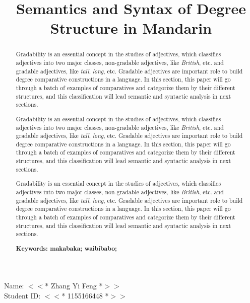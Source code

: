 \documentclass{ctexart}
\title{\LARGE{\bfseries{Semantics and Syntax of Degree Structure in Mandarin}}}
\date{\vspace{-10ex}}
\begin{document}
\begin{center}

Name: $<<$* Zhang Yi Feng *$>>$ \\
Student ID: $<<$* 1155166448 *$>>$

\end{center}

{\let\newpage\relax\maketitle}

\begin{abstract}
    \normalsize {
        Gradability is an essential concept in the studies of adjectives, which classifies adjectives into two major classes, non-gradable adjectives, like \textit{British}, etc. and gradable adjectives, like \textit{tall}, \textit{long}, etc. Gradable adjectives are important role to build degree comparative constructions in a language. In this section, this paper will go through a batch of examples of comparatives and categorize them by their different structures, and this classification will lead semantic and syntactic analysis in next sections. 

        Gradability is an essential concept in the studies of adjectives, which classifies adjectives into two major classes, non-gradable adjectives, like \textit{British}, etc. and gradable adjectives, like \textit{tall}, \textit{long}, etc. Gradable adjectives are important role to build degree comparative constructions in a language. In this section, this paper will go through a batch of examples of comparatives and categorize them by their different structures, and this classification will lead semantic and syntactic analysis in next sections. 

        Gradability is an essential concept in the studies of adjectives, which classifies adjectives into two major classes, non-gradable adjectives, like \textit{British}, etc. and gradable adjectives, like \textit{tall}, \textit{long}, etc. Gradable adjectives are important role to build degree comparative constructions in a language. In this section, this paper will go through a batch of examples of comparatives and categorize them by their different structures, and this classification will lead semantic and syntactic analysis in next sections. 

        \vspace{2ex}
        \bf{ Keywords: makabaka; waibibabo;}
    }
    
\end{abstract}
\end{document}
